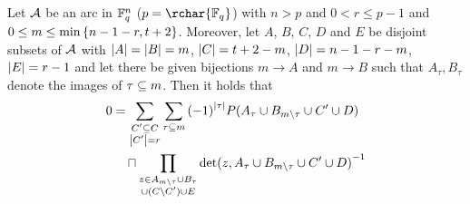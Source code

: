 \begin{lemma}
    Let $\mathcal{A}$ be an arc in $\mathbb{F}_{q}^n$ ($p=\rchar{\field{q}}$) with $n>p$ and $0< r\leq p-1$ and $0\leq m\leq \min\left\{n-1-r,t+2\right\}$. Moreover, let $A$, $B$, $C$, $D$ and $E$ be disjoint subsets of $\mathcal{A}$ with $\left|A\right|=\left|B\right|=m$, $\left|C\right|=t+2-m$, $\left|D\right|=n-1-r-m$, $\left|E\right|=r-1$ and let there be given bijections $m\to A$ and $m\to B$ such that $A_\tau, B_\tau$ denote the images of $\tau\subseteq m$. Then it holds that
    \begin{align*}
        0 & = \sum_{\substack{C'\setleq C                                                                       \\
                \card{C'}=r}}
        {\sum_{\tau\setleq m}{{(-1)}^{\card{\tau}}P(A_{\tau}\setjoin B_{m\setminus\tau}\setjoin C'\setjoin D)}} \\
          & \quad\settimes\prod_{\substack{z\in A_{m\setminus\tau}\setjoin B_{\tau}                                  \\
                  \setjoin(C\setminus C')\setjoin E}}
          {{\det(z,A_{\tau}\setjoin B_{m\setminus\tau}\setjoin C'\setjoin D)}^{-1}}
\end{align*}
\end{lemma}
